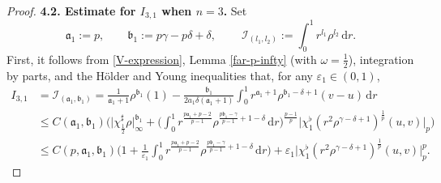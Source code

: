\documentclass[11pt,reqno]{amsart}
\numberwithin{rk}{section}
\numberwithin{prop}{section}
\numberwithin{mydef}{section}
\numberwithin{lem}{section}
\numberwithin{equation}{section}
\numberwithin{thm}{section}
\begin{document}
\begin{proof}
\smallskip
\textbf{4.2. Estimate for $I_{3,1}$ when $n=3$.} Set 
\begin{equation*}
\mathfrak{a}_1:=p,\qquad \mathfrak{b}_1:=p\gamma-p\delta+\delta,\qquad \ \mathcal{I}_{(l_1,l_2)}:=\int_0^1  r^{l_1}\rho^{l_2}\,\mathrm{d}r.
\end{equation*}
First, it follows from \eqref{V-expression}, Lemma \ref{far-p-infty} (with $\omega=\frac{1}{2}$), integration by parts, and the H\"older and Young inequalities that, for any $\varepsilon_1\in (0,1)$,
\begin{equation}\label{a1-b1}
\begin{aligned}
I_{3,1} &=\mathcal{I}_{(\mathfrak{a}_1,\mathfrak{b}_1)}=\frac{1}{\mathfrak{a}_1+1}\rho^{\mathfrak{b}_1}(1)-\frac{\mathfrak{b}_1}{2a_1\delta(\mathfrak{a}_1+1)}\int_0^1  r^{\mathfrak{a}_1+1} \rho^{\mathfrak{b}_1-\delta+1}(v-u)\,\mathrm{d}r\\
&\leq C(\mathfrak{a}_1,\mathfrak{b}_1)\Big(\big|\chi_\frac{1}{2}^\sharp \rho\big|_\infty^{\mathfrak{b}_1}+ \big(\int_0^1  r^\frac{p\mathfrak{a}_1+p-2}{p-1} \rho^{\frac{p\mathfrak{b}_1-\gamma}{p-1}+1-\delta} \,\mathrm{d}r\big)^\frac{p-1}{p}\big|\chi_1^\flat(r^2\rho^{\gamma-\delta+1})^\frac{1}{p}(u,v)\big|_{p}\Big)\\
&\leq C(p,\mathfrak{a}_1,\mathfrak{b}_1)\Big(1+\frac{1}{\varepsilon_1}\int_0^1  r^\frac{p\mathfrak{a}_1+p-2}{p-1} \rho^{\frac{p\mathfrak{b}_1-\gamma}{p-1}+1-\delta} \,\mathrm{d}r\Big)+\varepsilon_1 \big|\chi_1^\flat(r^2\rho^{\gamma-\delta+1})^\frac{1}{p}(u,v)\big|_{p}^{p}.
\end{aligned}
\end{equation}


\end{proof}
\end{document}
